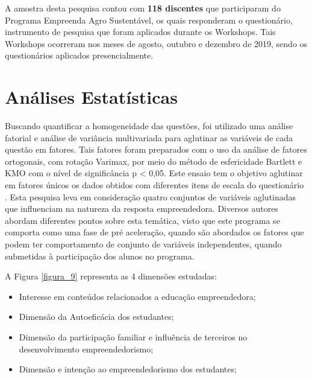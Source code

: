 A amostra desta pesquisa contou com \textbf{118 discentes} que participaram do Programa Empreenda Agro Sustentável, os quais responderam o questionário, instrumento de pesquisa que foram aplicados durante os Workshops. Tais Workshops ocorreram nos meses de agosto, outubro e dezembro de 2019, sendo os questionários aplicados presencialmente.

\section{Análises Estatísticas}


Buscando quantificar a homogeneidade das questões, foi utilizado uma análise fatorial e análise de variância multivariada para aglutinar as variáveis de cada questão em fatores. Tais fatores foram preparados com o uso da análise de fatores ortogonais, com rotação Varimax, por meio do método de esfericidade Bartlett e KMO com o nível de significância p < 0,05. Este ensaio tem o objetivo aglutinar em fatores únicos os dados obtidos com diferentes itens de escala do questionário \cite{hair_multivariate_2006}. Esta pesquisa leva em consideração quatro conjuntos de variáveis aglutinadas que influenciam na natureza da resposta empreendedora. Diversos autores abordam diferentes pontos sobre esta temática, visto que este programa se comporta como uma fase de pré aceleração, quando são abordados os fatores que podem ter comportamento de conjunto de variáveis independentes, quando submetidas à participação dos alunos no programa. 

A Figura \ref{figura_9} representa as 4 dimensões estudadas:


\begin{itemize}
\item {Interesse em conteúdos relacionados a educação empreendedora;}
\item {Dimensão da Autoeficácia dos estudantes;}
\item {Dimensão da participação familiar e influência de terceiros no desenvolvimento empreendedorismo;}
\item {Dimensão e intenção  ao empreendedorismo dos estudantes;}
\end{itemize}



